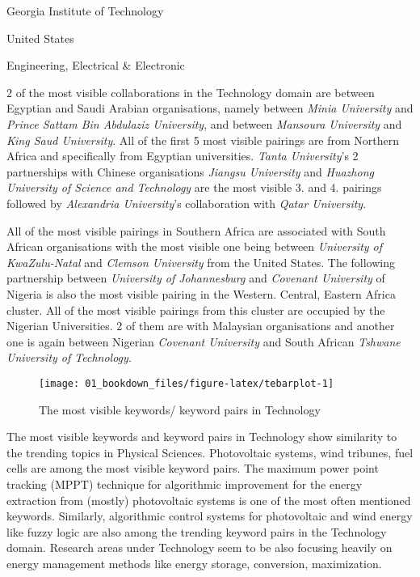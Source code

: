 \documentclass[12pt,twoside]{report}
\begin{document}
{Georgia Institute of Technology }

{United States}

{Engineering, Electrical \& Electronic }

2 of the most visible collaborations in the Technology domain are between Egyptian and Saudi Arabian organisations, namely between \emph{Minia University} and \emph{Prince Sattam Bin Abdulaziz University}, and between \emph{Mansoura University} and \emph{King Saud University}. All of the first 5 most visible pairings are from Northern Africa and specifically from Egyptian universities. \emph{Tanta University}'s 2 partnerships with Chinese organisations \emph{Jiangsu University} and \emph{Huazhong University of Science and Technology} are the most visible 3. and 4. pairings followed by \emph{Alexandria University}'s collaboration with \emph{Qatar University}.

All of the most visible pairings in Southern Africa are associated with South African organisations with the most visible one being between \emph{University of KwaZulu-Natal} and \emph{Clemson University} from the United States. The following partnership between \emph{University of Johannesburg} and \emph{Covenant University} of Nigeria is also the most visible pairing in the Western. Central, Eastern Africa cluster. All of the most visible pairings from this cluster are occupied by the Nigerian Universities. 2 of them are with Malaysian organisations and another one is again between Nigerian \emph{Covenant University} and South African \emph{Tshwane University of Technology}.

\begin{figure}
\texttt{[image: 01\_bookdown\_files/figure-latex/tebarplot-1]} \caption{The most visible keywords/ keyword pairs in Technology}\label{fig:tebarplot}
\end{figure}

The most visible keywords and keyword pairs in Technology show similarity to the trending topics in Physical Sciences. Photovoltaic systems, wind tribunes, fuel cells are among the most visible keyword pairs. The maximum power point tracking (MPPT) technique for algorithmic improvement for the energy extraction from (mostly) photovoltaic systems is one of the most often mentioned keywords. Similarly, algorithmic control systems for photovoltaic and wind energy like fuzzy logic are also among the trending keyword pairs in the Technology domain. Research areas under Technology seem to be also focusing heavily on energy management methods like energy storage, conversion, maximization.
\end{document}
